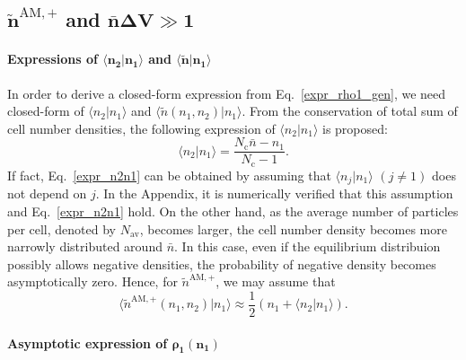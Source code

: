 \documentclass{article}
\newcommand{\dV}{{\Delta V}}
\newcommand{\Nc}{{N_\mathrm{c}}}
\newcommand{\nb}{\bar{n}}
\newcommand{\Nav}{{N_\mathrm{av}}}
\begin{document}
\subsection{\label{subsec_main_res_AMNav}$\bm{\tilde{n}^{\mathrm{AM},+}}$ and $\bm{\nb\dV\gg 1}$}

\paragraph{Expressions of $\bm{\langle n_2|n_1\rangle}$ and $\bm{\langle\tilde{n}|n_1\rangle}$}

In order to derive a closed-form expression from Eq.~\eqref{expr_rho1_gen}, we need closed-form of $\langle n_2|n_1\rangle$ and $\langle\tilde{n}(n_1,n_2)|n_1\rangle$.
From the conservation of total sum of cell number densities, the following expression of $\langle n_2|n_1\rangle$ is proposed:
\begin{equation}
\label{expr_n2n1}
\langle n_2|n_1\rangle = \frac{\Nc\nb-n_1}{\Nc-1}.
\end{equation}
If fact, Eq.~\eqref{expr_n2n1} can be obtained by assuming that $\langle n_j|n_1\rangle$ $(j\ne1)$ does not depend on $j$.
In the Appendix, it is numerically verified that this assumption and Eq.~\eqref{expr_n2n1} hold.
On the other hand, as the average number of particles per cell, denoted by $\Nav$, becomes larger, the cell number density becomes more narrowly distributed around $\nb$.
In this case, even if the equilibrium distribuion possibly allows negative densities, the probability of negative density becomes asymptotically zero.
Hence, for $\tilde{n}^{\mathrm{AM},+}$, we may assume that 
\begin{equation}
\label{expr_ntilden1}
\langle\tilde{n}^{\mathrm{AM},+}(n_1,n_2)|n_1\rangle\approx
\frac12\left(n_1+\langle n_2|n_1\rangle\right).
\end{equation}

\paragraph{Asymptotic expression of $\bm{\rho_1(n_1)}$}
\end{document}
